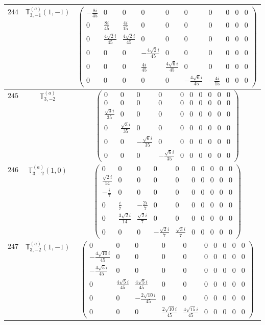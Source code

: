 \documentclass[fleqn,8pt,landscape]{jsarticle}
\begin{document}
\begin{center}
\begin{longtable}{ccc}
$ 244 $ & $ \mathbb{T}_{3,-1}^{(a)}(1,-1) $ & $ \begin{pmatrix} - \frac{8 i}{45} & 0 & 0 & 0 & 0 & 0 & 0 & 0 & 0 & 0 \\ 0 & \frac{8 i}{45} & \frac{4 i}{15} & 0 & 0 & 0 & 0 & 0 & 0 & 0 \\ 0 & \frac{4 \sqrt{2} i}{45} & \frac{4 \sqrt{2} i}{45} & 0 & 0 & 0 & 0 & 0 & 0 & 0 \\ 0 & 0 & 0 & - \frac{4 \sqrt{2} i}{45} & 0 & 0 & 0 & 0 & 0 & 0 \\ 0 & 0 & 0 & \frac{4 i}{45} & \frac{4 \sqrt{6} i}{45} & 0 & 0 & 0 & 0 & 0 \\ 0 & 0 & 0 & 0 & 0 & - \frac{4 \sqrt{6} i}{45} & - \frac{4 i}{15} & 0 & 0 & 0 \end{pmatrix} $ \\ \hline
$ 245 $ & $ \mathbb{T}_{3,-2}^{(a)} $ & $ \begin{pmatrix} 0 & 0 & 0 & 0 & 0 & 0 & 0 & 0 & 0 & 0 \\ 0 & 0 & 0 & 0 & 0 & 0 & 0 & 0 & 0 & 0 \\ \frac{\sqrt{3} i}{35} & 0 & 0 & 0 & 0 & 0 & 0 & 0 & 0 & 0 \\ 0 & \frac{\sqrt{3} i}{35} & 0 & 0 & 0 & 0 & 0 & 0 & 0 & 0 \\ 0 & 0 & - \frac{\sqrt{6} i}{35} & 0 & 0 & 0 & 0 & 0 & 0 & 0 \\ 0 & 0 & 0 & - \frac{\sqrt{6} i}{35} & 0 & 0 & 0 & 0 & 0 & 0 \end{pmatrix} $ \\ \hline
$ 246 $ & $ \mathbb{T}_{3,-2}^{(a)}(1,0) $ & $ \begin{pmatrix} 0 & 0 & 0 & 0 & 0 & 0 & 0 & 0 & 0 & 0 \\ \frac{\sqrt{2} i}{14} & 0 & 0 & 0 & 0 & 0 & 0 & 0 & 0 & 0 \\ - \frac{i}{7} & 0 & 0 & 0 & 0 & 0 & 0 & 0 & 0 & 0 \\ 0 & \frac{i}{7} & - \frac{2 i}{7} & 0 & 0 & 0 & 0 & 0 & 0 & 0 \\ 0 & \frac{3 \sqrt{2} i}{14} & \frac{\sqrt{2} i}{7} & 0 & 0 & 0 & 0 & 0 & 0 & 0 \\ 0 & 0 & 0 & - \frac{\sqrt{2} i}{7} & \frac{\sqrt{3} i}{7} & 0 & 0 & 0 & 0 & 0 \end{pmatrix} $ \\ \hline
$ 247 $ & $ \mathbb{T}_{3,-2}^{(a)}(1,-1) $ & $ \begin{pmatrix} 0 & 0 & 0 & 0 & 0 & 0 & 0 & 0 & 0 & 0 \\ - \frac{4 \sqrt{10} i}{45} & 0 & 0 & 0 & 0 & 0 & 0 & 0 & 0 & 0 \\ - \frac{4 \sqrt{5} i}{45} & 0 & 0 & 0 & 0 & 0 & 0 & 0 & 0 & 0 \\ 0 & \frac{4 \sqrt{5} i}{45} & \frac{4 \sqrt{5} i}{45} & 0 & 0 & 0 & 0 & 0 & 0 & 0 \\ 0 & 0 & - \frac{2 \sqrt{10} i}{45} & 0 & 0 & 0 & 0 & 0 & 0 & 0 \\ 0 & 0 & 0 & \frac{2 \sqrt{10} i}{45} & \frac{4 \sqrt{15} i}{45} & 0 & 0 & 0 & 0 & 0 \end{pmatrix} $ \\ \hline

\end{longtable}
\end{center}
\end{document}
